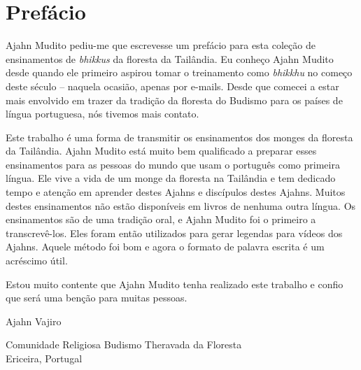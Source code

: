 
\chapter{Prefácio}

Ajahn Mudito pediu-me que escrevesse um prefácio para esta coleção
de ensinamentos de \emph{bhikkus} da floresta da Tailândia. Eu
conheço Ajahn Mudito desde quando ele primeiro aspirou tomar o
treinamento como \emph{bhikkhu} no começo deste século – naquela
ocasião, apenas por e-mails. Desde que comecei a estar mais envolvido
em trazer da tradição da floresta do Budismo para os países de língua
portuguesa, nós tivemos mais contato.

Este trabalho é uma forma de transmitir os ensinamentos dos monges
da floresta da Tailândia. Ajahn Mudito está muito bem qualificado a
preparar esses ensinamentos para as pessoas do mundo que usam o
português como primeira língua. Ele vive a vida de um monge da floresta
na Tailândia e tem dedicado tempo e atenção em aprender destes Ajahns e
discípulos destes Ajahns. Muitos destes ensinamentos não estão
disponíveis em livros de nenhuma outra língua. Os ensinamentos são de
uma tradição oral, e Ajahn Mudito foi o primeiro a transcrevê-los. Eles
foram então utilizados para gerar legendas para vídeos dos Ajahns.
Aquele método foi bom e agora o formato de palavra escrita é um
acréscimo útil.

Estou muito contente que Ajahn Mudito tenha realizado este trabalho
e confio que será uma benção para muitas pessoas.

\bigskip

{\raggedleft
Ajahn Vajiro

Comunidade Religiosa Budismo Theravada da Floresta\\
Ericeira, Portugal
\par}

